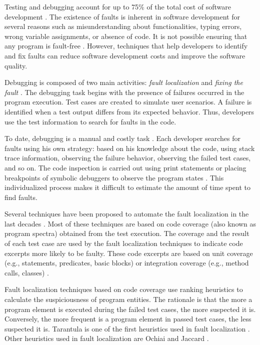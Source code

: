 \documentclass[12pt,a4paper,espaco=umemeio,noindentfirst,oneside,openany,tocpage=plain,pnumromarab,ruledheader,time,anapcustomindent]{sty/abnt}
\begin{document}
Testing and debugging account for up to 75\% of the total cost of software development \cite{hailpern2002,tassey2002}.
The existence of faults is inherent in software development for several reasons such as misunderstanding about 
functionalities, typing errors, wrong variable assignments, or absence of code. It is not possible ensuring that any 
program is fault-free \cite{jones2007}. However, techniques that help developers to identify and fix faults can reduce 
software development costs and improve the software quality.

Debugging is composed of two main activities: \textit{fault localization} and \textit{fixing the fault} \cite{Myers2004}. 
The debugging task begins with the presence of failures occurred in the program execution. Test cases are created to 
simulate user scenarios. A failure is identified when a test output differs from its expected behavior. Thus, developers 
use the test information to search for faults in the code.

To date, debugging is a manual and costly task \cite{jones2007}. Each developer searches for faults using his own strategy: 
based on his knowledge about the code, using stack trace information, observing the failure behavior, observing the 
failed test cases, and so on. The code inspection is carried out using print statements or placing breakpoints of 
symbolic debuggers to observe the program states \cite{jones2007}. This individualized process makes it difficult to 
estimate the amount of time spent to find faults.

Several techniques have been proposed to automate the fault localization in the last decades 
\cite{mariani2011,naish2010,santelices2009,masri2010,burger2008}. Most of these techniques 
are based on code coverage (also known as program spectra) obtained from the test execution. The coverage and the result 
of each test case are used by the fault localization techniques to indicate code excerpts more likely to be faulty. These code 
excerpts are based on unit coverage (e.g., statements, predicates, basic blocks) \cite{wong2010,jones2002} or integration 
coverage (e.g., method calls, classes) \cite{mariani2011,souza2012b,souza2013}.

Fault localization techniques based on code coverage use ranking heuristics to calculate the suspiciousness of program entities.
The rationale is that the more a program element is executed during the failed test cases, the more suspected  it is. Conversely, 
the more frequent is a program element in passed test cases, the less suspected it is. Tarantula is one of the first heuristics 
used in fault localization \cite{jones2002}. Other heuristics used in fault localization are Ochiai and Jaccard \cite{abreu2007}.
\end{document}
